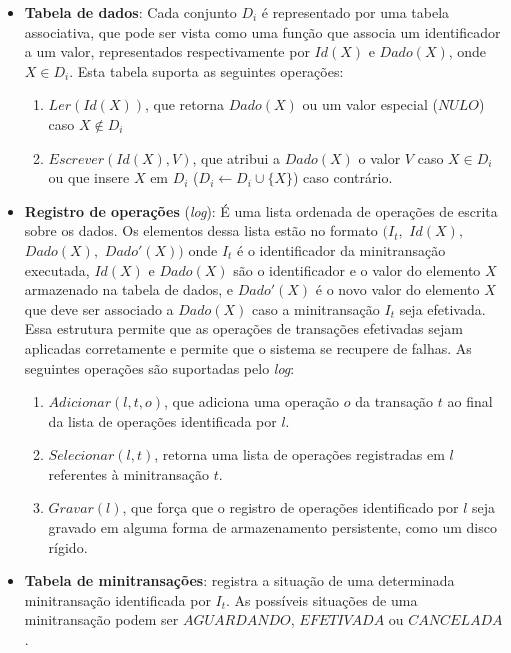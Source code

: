 \documentclass[11pt,twoside,a4paper]{book}
\begin{document}
\begin{itemize}

    \item \textbf{Tabela de dados}: Cada conjunto \(D_i\) é representado por uma tabela associativa, que pode ser vista como uma função que associa um identificador a um valor, representados respectivamente por \(Id(X)\) e \(Dado(X)\), onde \(X \in D_i\). Esta tabela suporta as seguintes operações:

    \begin{enumerate}
        \item $Ler(Id(X))$, que retorna $Dado(X)$ ou um valor especial ($NULO$) caso $X \notin D_i$

        \item $Escrever(Id(X), V)$, que atribui a $Dado(X)$ o valor $V$ caso $X \in D_i$ ou que insere $X$ em $D_i$ ($D_i \gets D_i \cup \{X\}$) caso contrário. 
    \end{enumerate}
 
    \item \textbf{Registro de operações} (\emph{log}): É uma lista ordenada de operações de escrita sobre os dados. Os elementos dessa lista estão no formato $(I_t,$ $Id(X),$ $Dado(X),$ $Dado'(X))$ onde $I_t$ é o identificador da minitransação executada, $Id(X)$ e $Dado(X)$ são o identificador e o valor do elemento $X$ armazenado na tabela de dados, e $Dado'(X)$ é o novo valor do elemento $X$ que deve ser associado a $Dado(X)$ caso a minitransação $I_t$ seja efetivada. Essa estrutura permite que as operações de transações efetivadas sejam aplicadas corretamente e permite que o sistema se recupere de falhas. As seguintes operações são suportadas pelo \emph{log}:

        \begin{enumerate}
            \item $Adicionar(l, t, o)$, que adiciona uma operação $o$ da transação $t$ ao final da lista de operações identificada por $l$.

            \item $Selecionar(l, t)$, retorna uma lista de operações registradas em $l$ referentes à minitransação $t$.

            \item $Gravar(l)$, que força que o registro de operações identificado por $l$ seja gravado em alguma forma de armazenamento persistente, como um disco rígido.
        \end{enumerate}

    \item \textbf{Tabela de minitransações}: registra a situação de uma determinada minitransação identificada por $I_t$. As possíveis situações de uma minitransação podem ser $AGUARDANDO$, $EFETIVADA$ ou $CANCELADA$.


\end{itemize}
\end{document}
